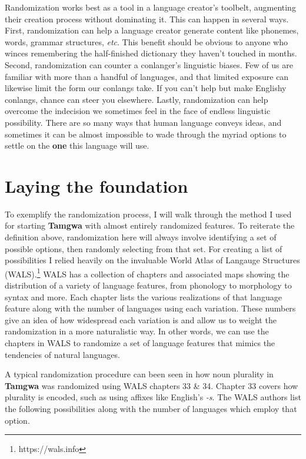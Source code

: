 \documentclass[a4paper,12pt,twoside,openright]{memoir}
\begin{document}
    Randomization works best as a tool in a language creator's toolbelt, augmenting their creation process without dominating it.  This can happen in several ways.  First, randomization can help a language creator generate content like phonemes, words, grammar structures, \textit{etc}.  This benefit should be obvious to anyone who winces remembering the half-finished dictionary they haven't touched in months. Second, randomization can counter a conlanger's linguistic biases.  Few of us are familiar with more than a handful of languages, and that limited exposure can likewise limit the form our conlangs take.  If you can't help but make Englishy conlangs, chance can steer you elsewhere.  Lastly, randomization can help overcome the indecision we sometimes feel in the face of endless linguistic possibility.  There are so many ways that human language conveys ideas, and sometimes it can be almost impossible to wade through the myriad options to settle on the \textbf{one} this language will use.

\section*{Laying the foundation} %

    To exemplify the randomization process, I will walk through the method I used for starting \textbf{Tamgwa} with almost entirely randomized features.  To reiterate the definition above, randomization here will always involve identifying a set of possible options, then randomly selecting from that set.  For creating a list of possibilities I relied heavily on the invaluable World Atlas of Langauge Structures (WALS).\footnote{https://wals.info}  WALS has a collection of chapters and associated maps showing the distribution of a variety of language features, from phonology to morphology to syntax and more.  Each chapter lists the various realizations of that language feature along with the number of languages using each variation.  These numbers give an idea of how widespread each variation is and allow us to weight the randomization in a more naturalistic way.  In other words, we can use the chapters in WALS to randomize a set of language features that mimics the tendencies of natural languages.

     A typical randomization procedure can been seen in how noun plurality in \textbf{Tamgwa} was randomized using WALS chapters 33 \& 34.  Chapter 33 covers how plurality is encoded, such as using affixes like English's \textit{-s}.  The WALS authors list the following possibilities along with the number of languages which employ that option.
\end{document}
